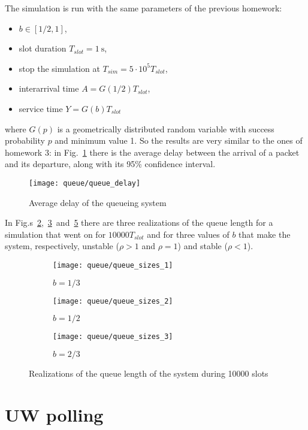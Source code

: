 \documentclass[a4paper,oneside]{article}
\begin{document}
The simulation is run with the same parameters of the previous
homework:
\begin{itemize}
\item $ b \in [1/2, 1]$,
\item slot duration $T_{slot} = \SI{1}{\s}$,
\item stop the simulation at $T_{sim} = 5 \cdot 10^5 T_{slot}$,
\item interarrival time $A = G(1/2)T_{slot}$,
\item service time $Y = G(b)T_{slot}$
\end{itemize}
where $G(p)$ is a geometrically distributed random variable with
success probability $p$ and minimum value 1. So the results are very
similar to the ones of homework 3: in Fig.~\ref{plot:queue_delay}
there is the average delay between the arrival of a packet and its
departure, along with its 95\% confidence interval.
\begin{figure}[htbp]
  \centering
    \texttt{[image: queue/queue\_delay]}
    \caption{Average delay of the queueing system}
    \label{plot:queue_delay}
\end{figure}
In
Fig.s~\ref{plot:queue_sizes_unstable},~\ref{plot:queue_sizes_limit}~and~\ref{plot:queue_sizes_stable}
there are three realizations of the queue length for a simulation that
went on for $10000T_{slot}$ and for three values of $b$ that make the
system, respectively, unstable ($\rho > 1$ and $\rho = 1$) and stable
($\rho < 1$).
\begin{figure}[htbp]
  \centering
  \begin{subfigure}{0.5\textwidth}
    \centering
    \texttt{[image: queue/queue\_sizes\_1]}
    \caption{$ b = 1/3 $}
    \label{plot:queue_sizes_unstable}
  \end{subfigure}%
  \begin{subfigure}{0.5\textwidth}
    \centering
    \texttt{[image: queue/queue\_sizes\_2]}
    \caption{$ b = 1/2 $}
    \label{plot:queue_sizes_limit}
  \end{subfigure}
  \begin{subfigure}{0.5\textwidth}
    \centering
    \texttt{[image: queue/queue\_sizes\_3]}
    \caption{$ b = 2/3 $}
    \label{plot:queue_sizes_stable}
  \end{subfigure}
  \caption{Realizations of the queue length of the system during 10000 slots}
\end{figure}

\section{UW polling}
\end{document}
